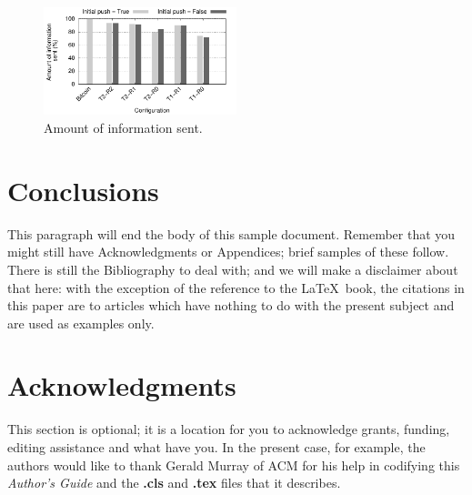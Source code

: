 \documentclass{dads}   %
\begin{document}
\begin{figure}
\centering
\includegraphics[width=0.5\textwidth]{plots/mb-sent.pdf}
\caption{Amount of information sent.}
\label{fig:mb-sent}
\end{figure}

\section{Conclusions}
This paragraph will end the body of this sample document.
Remember that you might still have Acknowledgments or
Appendices; brief samples of these
follow.  There is still the Bibliography to deal with; and
we will make a disclaimer about that here: with the exception
of the reference to the \LaTeX\ book, the citations in
this paper are to articles which have nothing to
do with the present subject and are used as
examples only.

\section{Acknowledgments}
This section is optional; it is a location for you
to acknowledge grants, funding, editing assistance and
what have you.  In the present case, for example, the
authors would like to thank Gerald Murray of ACM for
his help in codifying this \textit{Author's Guide}
and the \textbf{.cls} and \textbf{.tex} files that it describes.

%

%
%
\end{document}
